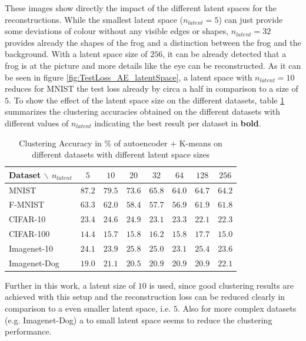 \documentclass[12pt,DIV14,BCOR12mm,a4paper,footexclude,headinclude,halfparskip-,twoside,openright,cleardoubleempty,idxtotoc,bibtotoc,listtotoc,abstracton]{scrreprt} %
\numberwithin{equation}{chapter}
\begin{document}
These images show directly the impact of the different latent spaces for the reconstructions. While the smallest latent space ($n_{latent}=5$) can just provide some deviations of colour without any visible edges or shapes, $n_{latent}=32$ provides already the shapes of the frog and a distinction between the frog and the background. With a latent space size of $256$, it can be already detected that a frog is at the picture and more details like the eye can be reconstructed.
As it can be seen in figure \ref{fig:TestLoss_AE_latentSpace}, a latent space with $n_{latent}=10$ reduces for MNIST the test loss already by circa a half in comparison to a size of $5$. To show the effect of the latent space size on the different datasets, table \ref{tab:ClusterACC_n_latent} summarizes the clustering accuracies obtained on the different datasets with different values of $n_{latent}$ indicating the best result per dataset in \textbf{bold}.
	\begin{table}[htb!]
    		\centering
    		\caption{Clustering Accuracy in \% of autoencoder + K-means on different datasets with different latent space sizes}
    		\label{tab:ClusterACC_n_latent}
    		\begin{tabular}{l|ccccccc}
        		Dataset $\backslash$ $n_{latent}$ & $5$ & $10$ & $20$ & $32$ & $64$ & $128$ & $256$\\ \hline
        		MNIST & $\mathbf{87.2}$ & $79.5$ & $73.6$ & $65.8$ & $64.0$ & $64.7$ & $64.2$\\
        		F-MNIST & $\mathbf{63.3}$ & $62.0$ & $58.4$ & $57.7$ & $56.9$ & $61.9$ & $61.8$\\
        		CIFAR-10 & $23.4$ & $24.6$ & $\mathbf{24.9}$ & $23.1$ & $23.3$ & $22.1$ & $22.3$\\
        		CIFAR-100 & $14.4$ & $15.7$ & $15.8$ & $\mathbf{16.2}$ & $15.8$ & $17.7$ & $15.0$\\
        		Imagenet-10 & $24.1$ & $23.9$ & $\mathbf{25.8}$ & $25.0$ & $23.1$ & $25.4$ & $23.6$\\
        		Imagenet-Dog & $19.0$ & $21.1$ & $20.5$ & $20.9$ & $20.9$ & $20.9$ & $\mathbf{22.1}$\\
    		\end{tabular}
	\end{table}
Further in this work, a latent size of $10$ is used, since good clustering results are achieved with this setup and the reconstruction loss can be reduced clearly in comparison to a even smaller latent space, i.e. $5$. Also for more complex datasets (e.g. Imagenet-Dog) a to small latent space seems to reduce the clustering performance.
\end{document}
